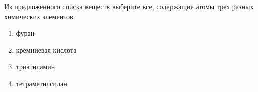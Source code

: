 Из предложенного списка веществ выберите все, содержащие атомы трех разных химических элементов.
		\begin{enumerate}
		\item фуран
		\item кремниевая кислота
		\item триэтиламин
		\item тетраметилсилан
		\end{enumerate}
